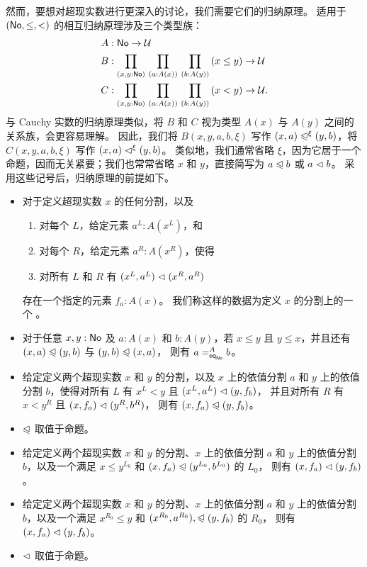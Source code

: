 然而，要想对超现实数进行更深入的讨论，我们需要它们的归纳原理。
适用于 $(\NO,\le,<)$ 的相互归纳原理涉及三个类型族：
\begin{align*}
  A &: \NO\to\type\\
  B &: \prd{x,y:\NO}{a:A(x)}{b:A(y)} (x\le y) \to \type\\
  C &: \prd{x,y:\NO}{a:A(x)}{b:A(y)} (x<y) \to \type.
\end{align*}
与 Cauchy 实数的归纳原理类似，将 $B$ 和 $C$ 视为类型 $A(x)$ 与 $A(y)$ 之间的关系族，会更容易理解。
因此，我们将 $B(x,y,a,b,\xi)$ 写作 $(x,a) \ble^\xi (y,b)$，将 $C(x,y,a,b,\xi)$ 写作 $(x,a) \blt^\xi (y,b)$。
类似地，我们通常省略 $\xi$，因为它居于一个命题，因而无关紧要；我们也常常省略 $x$ 和 $y$，直接简写为 $a\ble b$ 或 $a\blt b$。
采用这些记号后，归纳原理的前提如下。

\begin{itemize}
\item 对于定义超现实数 $x$ 的任何分割，以及
  \begin{enumerate}
  \item 对每个 $L$，给定元素 $a^L:A(x^L)$，和
  \item 对每个 $R$，给定元素 $a^R:A(x^R)$，使得
  \item 对所有 $L$ 和 $R$ 有 $(x^L,a^L) \blt (x^R,a^R)$
  \end{enumerate}
  存在一个指定的元素 $f_a:A(x)$。
  我们称这样的数据为定义 $x$ 的分割上的一个
  。%
\item 对于任意 $x,y:\NO$ 及 $a:A(x)$ 和 $b:A(y)$，若 $x\le y$ 且 $y\le x$，并且还有 $(x,a) \ble (y,b)$
  与 $(y,b) \ble (x,a)$，
  则有 $\dpath{A}{\noeq}{a}{b}$。
\item 给定定义两个超现实数 $x$ 和 $y$ 的分割，以及 $x$ 上的依值分割 $a$ 和 $y$ 上的依值分割 $b$，使得对所有 $L$ 有 $x^L<y$ 且 $(x^L,a^L)\blt (y,f_b)$，
  并且对所有 $R$ 有 $x<y^R$ 且 $(x,f_a) \blt (y^R,b^R)$，
  则有 $(x,f_a) \ble (y,f_b)$。
\item $\ble$ 取值于命题。
\item 给定定义两个超现实数 $x$ 和 $y$ 的分割、$x$ 上的依值分割 $a$ 和 $y$ 上的依值分割 $b$，以及一个满足 $x\le y^{L_0}$ 和 $(x,f_a) \ble (y^{L_0},b^{L_0})$ 的 $L_0$，
  则有 $(x,f_a) \blt (y,f_b)$。
\item 给定定义两个超现实数 $x$ 和 $y$ 的分割、$x$ 上的依值分割 $a$ 和 $y$ 上的依值分割 $b$，以及一个满足 $x^{R_0}\le y$ 和 $(x^{R_0},a^{R_0}),\ble (y,f_b)$ 的 ${R_0}$，
  则有 $(x,f_a) \blt (y,f_b)$。
\item $\blt$ 取值于命题。
\end{itemize}

